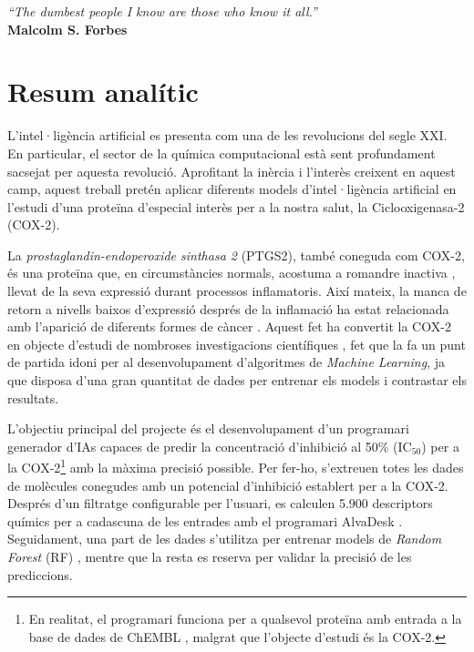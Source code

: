 \documentclass[11pt]{article}
\begin{document}
\restoregeometry
{}
\thispagestyle{empty}
\mbox{} 
\newpage
\thispagestyle{empty}
\vspace*{\fill} %
\begin{flushright}
    \emph{“The dumbest people I know are those who know it all.”}\\[1em]
    \textbf{Malcolm S. Forbes}
\end{flushright}
\vspace*{\fill} 
\newpage
\thispagestyle{empty}
\mbox{} 
\newpage

\thispagestyle{afteres}
\setcounter{page}{1}
\section*{Resum analític}\par
L'intel·ligència artificial es presenta com una de les revolucions del segle XXI. En particular, el sector de la química computacional està sent profundament sacsejat per aquesta revolució. Aprofitant la inèrcia i l'interès creixent en aquest camp, aquest treball pretén aplicar diferents models d'intel·ligència artificial en l'estudi d'una proteïna d'especial interès per a la nostra salut, la Ciclooxigenasa-2 (COX-2).

La \emph{prostaglandin-endoperoxide sinthasa 2} (PTGS2), també coneguda com COX-2, és una proteïna que, en circumstàncies normals, acostuma a romandre inactiva \cite{Cox2Location}, llevat de la seva expressió durant processos inflamatoris. Així mateix, la manca de retorn a nivells baixos d'expressió després de la inflamació ha estat relacionada amb l'aparició de diferents formes de càncer \cite{DefinitionCOX2CancerDictionary}. Aquest fet ha convertit la COX-2 en objecte d'estudi de nombroses investigacions científiques \cite{Cox2InhibitorsReview}, fet que la fa un punt de partida idoni per al desenvolupament d'algoritmes de \emph{Machine Learning}, ja que disposa d'una gran quantitat de dades per entrenar els models i contrastar els resultats.

L'objectiu principal del projecte és el desenvolupament d'un programari generador d'IAs capaces de predir la concentració d'inhibició al 50\% (IC$_{50}$) per a la COX-2\footnote{En realitat, el programari funciona per a qualsevol proteïna amb entrada a la base de dades de ChEMBL \cite{ChemblDatabase}, malgrat que l'objecte d'estudi és la COX-2.} amb la màxima precisió possible. Per fer-ho, s'extreuen totes les dades de molècules conegudes amb un potencial d'inhibició establert per a la COX-2. Després d'un filtratge configurable per l'usuari, es calculen 5.900 descriptors químics per a cadascuna de les entrades amb el programari AlvaDesk \cite{MauriMolecularDescriptorsBook}\cite{AlvaDescSecondPaper}. Seguidament, una part de les dades s'utilitza per entrenar models de \emph{Random Forest} (RF) \cite{MachineLearningRandomForest}, mentre que la resta es reserva per validar la precisió de les prediccions.
\end{document}
